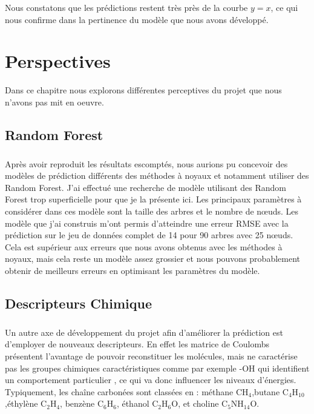 \documentclass[a4paper,12pt,titlepage]{report}
\begin{document}
Nous constatons que les prédictions restent très près de la courbe $y = x$, ce qui nous confirme dans la pertinence du modèle que nous avons développé.
	
\chapter{Perspectives}
Dans ce chapitre nous explorons différentes perceptives du projet que nous n'avons pas mit en oeuvre.
\section{Random Forest}
\paragraph{}
Après avoir reproduit les résultats escomptés, nous aurions pu concevoir des modèles de prédiction différents des méthodes à noyaux et notamment utiliser des Random Forest. J'ai effectué une recherche de modèle utilisant des Random Forest trop superficielle pour que je la présente ici.
Les principaux paramètres à considérer dans ces modèle sont la taille des arbres et le nombre de nœuds. Les modèle que j'ai construis m'ont permis d'atteindre une erreur RMSE avec la prédiction sur le jeu de données complet de 14 pour 90 arbres avec 25 nœuds. Cela est supérieur aux erreurs que nous avons obtenus avec les méthodes à noyaux, mais cela reste un modèle assez grossier et nous pouvons probablement obtenir de meilleurs erreurs en optimisant les paramètres du modèle.

\section{Descripteurs Chimique}
\paragraph{}
Un autre axe de développement du projet afin d'améliorer la prédiction est d'employer de nouveaux descripteurs.
En effet les matrice de Coulombs présentent l'avantage de pouvoir reconstituer les molécules, mais ne caractérise pas les groupes chimiques caractéristiques comme par exemple -OH qui identifient un comportement particulier , ce qui va donc influencer les niveaux d'énergies.
Typiquement, les chaîne carbonées sont classées en : méthane CH$_4$,butane  C$_4$H$_10$,éthylène C$_2$H$_4$, benzène C$_6$H$_6$, éthanol C$_2$H$_6$O, et choline C$_5$NH$_{14}$O.
	
\end{document}
